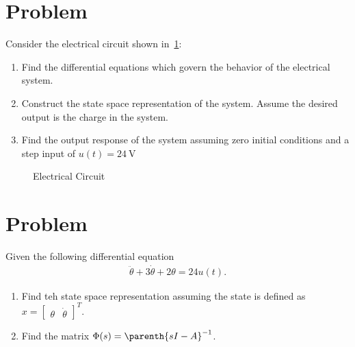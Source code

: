 \documentclass[titlepage, 11pt, reqno]{article}    %
\begin{document}
\section{Problem}
Consider the electrical circuit shown in~\cref{fig:elec_circuit}:
\begin{enumerate}
    \item Find the differential equations which govern the behavior of the electrical system.
    \item Construct the state space representation of the system. 
        Assume the desired output is the charge in the system.
    \item Find the output response of the system assuming zero initial conditions and a step input of \(u(t) = \SI{24}{\volt}\)
\end{enumerate}
\begin{figure}[htbp]
\centering
\begin{scaletikzpicturetowidth}{0.5\textwidth}
\end{scaletikzpicturetowidth}
\caption{Electrical Circuit~\label{fig:elec_circuit}}
\end{figure}

\section{Problem}
Given the following differential equation
\begin{align*}
    \ddot{\theta} + 3 \dot{\theta} + 2 \theta = 24 u(t).
\end{align*}

\begin{enumerate}
    \item Find teh state space representation assuming the state is  defined as \( x = \begin{bmatrix} \theta & \dot{\theta}\end{bmatrix}^T\).
    \item Find the matrix \( \Phi(s) = \parenth{sI - A}^{-1}\).
\end{enumerate}
\clearpage
\newpage
\clearpage

\end{document}
